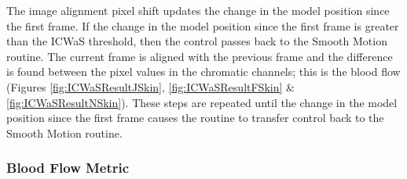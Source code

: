 The image alignment pixel shift updates the change in the model position since the first frame. If the change in the model position since the first frame is greater than the ICWaS threshold, then the control passes back to the Smooth Motion routine. The current frame is aligned with the previous frame and the difference is found between the pixel values in the chromatic channels; this is the blood flow (Figures  \ref{fig:ICWaSResultJSkin}, \ref{fig:ICWaSResultFSkin} \& \ref{fig:ICWaSResultNSkin}). These steps are repeated until the change in the model position since the first frame causes the routine to transfer control back to the Smooth Motion routine.

\clearpage

\subsubsection{Blood Flow Metric}\label{sec:BloodFlowMetric}

